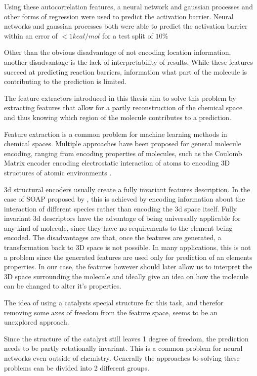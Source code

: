 Using these autocorrelation features, a neural network and gaussian processes and other forms of regression were used to predict the activation barrier.
Neural networks and gaussian processes both were able to predict the activation barrier within an error of $<1 kcal/mol$ for a test split of $10\%$

Other than the obvious disadvantage of not encoding location information, another disadvantage is the lack of interpretability of results.
While these features succeed at predicting reaction barriers, information what part of the molecule is contributing to the prediction is limited.

The feature extractors introduced in this thesis aim to solve this problem by extracting features that allow for a
partly reconstruction of the chemical space and thus knowing which region of the molecule contributes to a prediction.

Feature extraction is a common problem for machine learning methods in chemical spaces.
Multiple approaches have been proposed for general molecule encoding, 
ranging from encoding properties of molecules, such as the Coulomb Matrix encoder encoding electrostatic interaction of atoms \cite{PhysRevLett.108.058301}
to encoding 3D structures of atomic environments \cite{Bart_k_2013}.

3d structural encoders usually create a fully invariant features description.
In the case of SOAP proposed by \citeauthor{Bart_k_2013}, this is achieved by encoding information about the interaction of 
different species rather than encoding the 3d space itself.
Fully invariant 3d descriptors have the advantage of being universally applicable for any kind of molecule, since they have no requirements to the element being encoded.
The disadvantages are that, once the features are generated, a transformation back to 3D space is not possible.
In many applications, this is not a problem since the generated features are used only for prediction of an elements properties.
In our case, the features however should later allow us to interpret the 3D space surrounding the molecule and ideally give an idea on how the molecule can be changed to alter it's properties.

The idea of using a catalysts special structure for this task, and therefor removing some axes of freedom from the feature space, seems to be an unexplored approach.

Since the structure of the catalyst still leaves 1 degree of freedom, the prediction needs to be partly rotationally invariant.
This is a common problem for neural networks even outside of chemistry.
Generally the approaches to solving these problems can be divided into 2 different groups.

